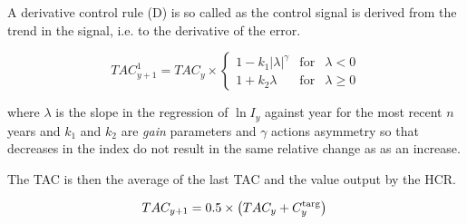 A derivative control rule (D) is so called as the control signal is derived from the trend in the signal, i.e. to the derivative of the error. 


\begin{equation}
 TAC^1_{y+1}=TAC_y\times 
 \left\{\begin{array}{rcl}  
    {1-k_1|\lambda|^{\gamma}} & \mbox{for} & \lambda<0\\[0.35cm]
    {1+k_2\lambda} & \mbox{for} & \lambda\geq 0 
 \end{array}\right.
\end{equation}

where $\lambda$ is the slope in the regression of $\ln I_y$ against year for the most recent $n$ years and $k_1$ and $k_2$ are \textit{gain} parameters and $\gamma$ actions asymmetry so that decreases in the index do not result in the same relative change as as an increase.

The TAC is then the average of the last TAC and the value output by the HCR. 

\begin{equation} 
     TAC_{y+1} = 0.5\times\left(TAC_y+C^{\rm targ}_y\right)\\
\end{equation}


